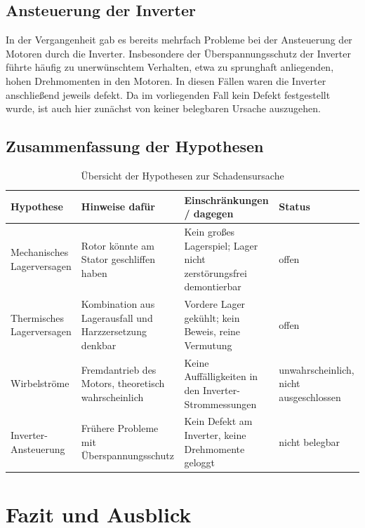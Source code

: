 \subsection{Ansteuerung der Inverter}
\label{subsec:hyp_inverter}

In der Vergangenheit gab es bereits mehrfach Probleme bei der Ansteuerung der Motoren durch die Inverter. Insbesondere der Überspannungsschutz der Inverter führte häufig zu unerwünschtem Verhalten, etwa zu sprunghaft anliegenden, hohen Drehmomenten in den Motoren. In diesen Fällen waren die Inverter anschließend jeweils defekt. Da im vorliegenden Fall kein Defekt festgestellt wurde, ist auch hier zunächst von keiner belegbaren Ursache auszugehen.

\subsection{Zusammenfassung der Hypothesen}
\label{subsec:hyp_zusammenfassung}

\begin{table}[htbp]
    \centering
    \caption{Übersicht der Hypothesen zur Schadensursache}
    \label{tab:hypothesen}
    \begin{tabular}{|p{3.2cm}|p{4.5cm}|p{4.5cm}|p{1.8cm}|}
        \hline
        Hypothese & Hinweise dafür & Einschränkungen / dagegen & Status \\
        \hline
        Mechanisches Lagerversagen
          & Rotor könnte am Stator geschliffen haben
          & Kein großes Lagerspiel; Lager nicht zerstörungsfrei demontierbar
          & offen \\
        \hline
        Thermisches Lagerversagen
          & Kombination aus Lagerausfall und Harzzersetzung denkbar
          & Vordere Lager gekühlt; kein Beweis, reine Vermutung
          & offen \\
        \hline
        Wirbelströme
          & Fremdantrieb des Motors, theoretisch wahrscheinlich
          & Keine Auffälligkeiten in den Inverter-Strommessungen
          & unwahrscheinlich, nicht ausgeschlossen \\
        \hline
        Inverter-Ansteuerung
          & Frühere Probleme mit Überspannungsschutz
          & Kein Defekt am Inverter, keine Drehmomente geloggt
          & nicht belegbar \\
        \hline
    \end{tabular}
\end{table}

 
\section{Fazit und Ausblick}
\label{sec:fazit_pruefstand}
 

